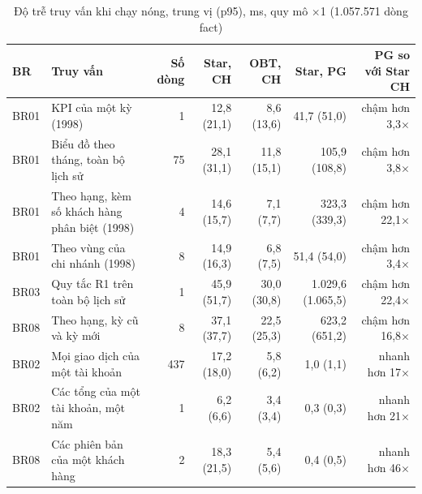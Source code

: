 \documentclass[peerreview]{IEEEtran}
\begin{document}
\begin{table}[!t]
\centering
\caption{Độ trễ truy vấn khi chạy nóng, trung vị (p95), ms, quy mô $\times$1 (1.057.571 dòng fact)}
\label{tab:results}
\small
\begin{tabular}{l L{5.0cm} r r r r r}
\toprule
\textbf{BR} & \textbf{Truy vấn} & \textbf{Số dòng} & \textbf{Star, CH} & \textbf{OBT, CH} & \textbf{Star, PG} & \textbf{PG so với Star CH} \\
\midrule
BR01 & KPI của một kỳ (1998) & 1 & 12,8 (21,1) & 8,6 (13,6) & 41,7 (51,0) & chậm hơn 3,3$\times$ \\
BR01 & Biểu đồ theo tháng, toàn bộ lịch sử & 75 & 28,1 (31,1) & 11,8 (15,1) & 105,9 (108,8) & chậm hơn 3,8$\times$ \\
BR01 & Theo hạng, kèm số khách hàng phân biệt (1998) & 4 & 14,6 (15,7) & 7,1 (7,7) & 323,3 (339,3) & chậm hơn 22,1$\times$ \\
BR01 & Theo vùng của chi nhánh (1998) & 8 & 14,9 (16,3) & 6,8 (7,5) & 51,4 (54,0) & chậm hơn 3,4$\times$ \\
BR03 & Quy tắc R1 trên toàn bộ lịch sử & 1 & 45,9 (51,7) & 30,0 (30,8) & 1.029,6 (1.065,5) & chậm hơn 22,4$\times$ \\
BR08 & Theo hạng, kỳ cũ và kỳ mới & 8 & 37,1 (37,7) & 22,5 (25,3) & 623,2 (651,2) & chậm hơn 16,8$\times$ \\
BR02 & Mọi giao dịch của một tài khoản & 437 & 17,2 (18,0) & 5,8 (6,2) & 1,0 (1,1) & nhanh hơn 17$\times$ \\
BR02 & Các tổng của một tài khoản, một năm & 1 & 6,2 (6,6) & 3,4 (3,4) & 0,3 (0,3) & nhanh hơn 21$\times$ \\
BR08 & Các phiên bản của một khách hàng & 2 & 18,3 (21,5) & 5,4 (5,6) & 0,4 (0,5) & nhanh hơn 46$\times$ \\
\bottomrule
\end{tabular}
\end{table}
\end{document}
